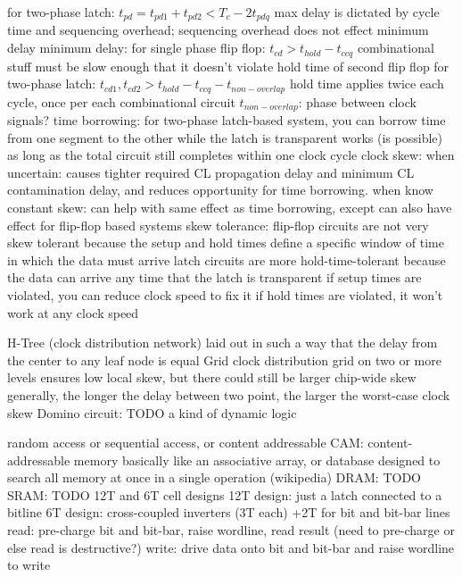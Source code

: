 \documentclass[12pt]{article}
\begin{document}
\begin{spacing}{0.8}
\begin{multicols*}{2}
\begin{flushleft}
\begin{outline}[longenum]
    \2 for two-phase latch: $t_{pd} = t_{pd1} + t_{pd2} < T_c - 2t_{pdq}$
    \2 max delay is dictated by cycle time and sequencing overhead; sequencing overhead does not effect minimum delay
  \1 minimum delay:
    \2 for single phase flip flop: $t_{cd} > t_{hold} - t_{ccq}$
      \3 combinational stuff must be slow enough that it doesn't violate hold time of second flip flop
    \2 for two-phase latch: $t_{cd1},t_{cd2} > t_{hold} - t_{ccq} - t_{non-overlap}$
      \3 hold time applies twice each cycle, once per each combinational circuit
      \3 $t_{non-overlap}$: phase between clock signals?
  \1 time borrowing: for two-phase latch-based system, you can borrow time from one segment to the other while the latch is transparent
    \2 works (is possible) as long as the total circuit still completes within one clock cycle
  \1 clock skew:
    \2 when uncertain: causes tighter required CL propagation delay and minimum CL contamination delay, and reduces opportunity for time borrowing.
    \2 when know constant skew: can help with same effect as time borrowing, except can also have effect for flip-flop based systems
  \1 skew tolerance:
    \2 flip-flop circuits are not very skew tolerant because the setup and hold times define a specific window of time in which the data must arrive
    \2 latch circuits are more hold-time-tolerant because the data can arrive any time that the latch is transparent
  \1 if setup times are violated, you can reduce clock speed to fix it
  \1 if hold times are violated, it won't work at any clock speed


  \1 H-Tree (clock distribution network)
    \2 laid out in such a way that the delay from the center to any leaf node is equal
  \1 Grid clock distribution
    \2 grid on two or more levels
    \2 ensures low local skew, but there could still be larger chip-wide skew
  \1 generally, the longer the delay between two point, the larger the worst-case clock skew
  \1 Domino circuit: TODO
    \2 a kind of dynamic logic


  \1 random access or sequential access, or content addressable
  \1 CAM: content-addressable memory
    \2 basically like an associative array, or database
    \2 designed to search all memory at once in a single operation (wikipedia)
  \1 DRAM: TODO
  \1 SRAM: TODO
    \2 12T and 6T cell designs
    \2 12T design: just a latch connected to a bitline
    \2 6T design: cross-coupled inverters (3T each) +2T for bit and bit-bar lines
      \3 read: pre-charge bit and bit-bar, raise wordline, read result
        \4 (need to pre-charge or else read is destructive?)
      \3 write: drive data onto bit and bit-bar and raise wordline to write





\end{outline}
\end{flushleft}
\end{multicols*}
\end{spacing}
\end{document}
